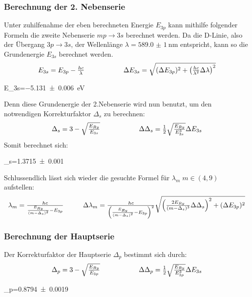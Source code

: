 \subsubsection{Berechnung der 2. Nebenserie}
Unter zuhilfenahme der eben berechneten Energie \(E_{3p}\) kann mithilfe folgender Formeln die zweite Nebenserie \(mp \to 3s\) berechnet werden. Da die D-Linie, also der Übergang \(3p\to 3s\), der Wellenlänge \(\lambda=\qty{589.0(10)}{\nano\m}\) entspricht, kann so die Grundenergie \(E_{3s}\) berechnet werden.
\begin{equation}
\begin{array}{c@{\hspace{2cm}}c}
  E_{3s}=E_{3p}-\frac{hc}{\lambda}&\Delta E_{3s}=\sqrt{(\Delta E_{3p})^2+\left(\frac{hc}{\lambda^2}\Delta \lambda\right)^2}
\end{array}
\label{eq:E_3s}
\end{equation}
\begin{rb}
  E_{3s}=\qty{-5.131(6)}{\electronvolt}
\end{rb}
Denn diese Grundenergie der 2.Nebenserie wird nun benutzt, um den notwendigen Korrekturfaktor \(\Delta_s\) zu berechnen:
\begin{equation}
\begin{array}{c@{\hspace{2cm}}c}
  \Delta_s=3-\sqrt{\frac{E_{Ry}}{E_{3s}}}&\Delta \Delta_s=\frac{1}{2}\sqrt{\frac{E_{Ry}}{E_{3s}^3}}\Delta E_{3s}
\end{array}
\label{eq:Deltas}
\end{equation}
Somit berechnet sich:
\begin{rb}
   \Delta_s=\num{1.3715(10)}
\end{rb}

Schlussendlich lässt sich wieder die gesuchte Formel für \(\lambda_m\;m\in (4,9)\) aufstellen:
\begin{equation}
\begin{array}{l@{\hspace{1cm}}c}
\lambda_m = \frac{hc}{\frac{E_{Ry}}{(m-\Delta_s)^2} - E_{3p}} & 
\Delta \lambda_m = \frac{hc}{\left( \frac{E_{Ry}}{(m-\Delta_s)^2} - E_{3p} \right)^2} \sqrt{ \left( \frac{2 E_{Ry}}{(m-\Delta_s)^3} \Delta \Delta_s \right)^2 + (\Delta E_{3p})^2 }
\end{array}
\label{eq:lambdam2ns}
\end{equation}

\subsubsection{Berechnung der Hauptserie}
Der Korrekturfaktor der Hauptserie \(\Delta_p\) bestimmt sich durch:
\begin{equation}
\begin{array}{c@{\hspace{2cm}}c}
  \Delta_p=3-\sqrt{\frac{E_{Ry}}{E_{3p}}}&\Delta \Delta_p=\frac{1}{2}\sqrt{\frac{E_{Ry}}{E_{3p}^3}}\Delta E_{3s}
\end{array}
\label{eq:Deltap}
\end{equation}
\begin{rb}
   \Delta_p=\num{0.8794(19)}
\end{rb}

